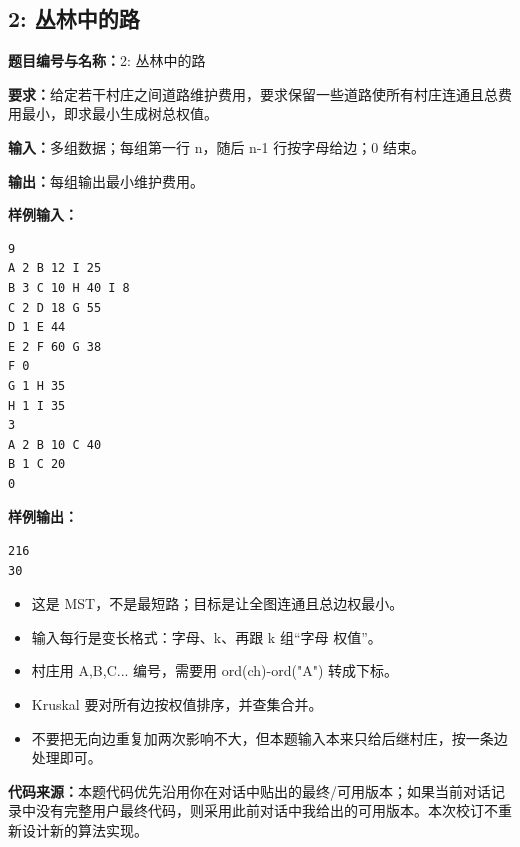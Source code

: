 \documentclass[10pt,a4paper,fontset=none]{ctexart}
\newcommand{\codesource}{\par\noindent\textbf{代码来源：}本题代码优先沿用你在对话中贴出的最终/可用版本；如果当前对话记录中没有完整用户最终代码，则采用此前对话中我给出的可用版本。本次校订不重新设计新的算法实现。\par\vspace{0.2em}}
\begin{document}
\subsection{2: 丛林中的路}
\begin{taskbox}
\textbf{题目编号与名称：}2: 丛林中的路\par
\textbf{要求：}给定若干村庄之间道路维护费用，要求保留一些道路使所有村庄连通且总费用最小，即求最小生成树总权值。\par
\textbf{输入：}多组数据；每组第一行 n，随后 n-1 行按字母给边；0 结束。\par
\textbf{输出：}每组输出最小维护费用。\par
\textbf{样例输入：}
\begin{lstlisting}[style=sample]
9
A 2 B 12 I 25
B 3 C 10 H 40 I 8
C 2 D 18 G 55
D 1 E 44
E 2 F 60 G 38
F 0
G 1 H 35
H 1 I 35
3
A 2 B 10 C 40
B 1 C 20
0
\end{lstlisting}
\textbf{样例输出：}
\begin{lstlisting}[style=sample]
216
30
\end{lstlisting}
\end{taskbox}
\begin{mistakebox}
\begin{itemize}
  \item 这是 MST，不是最短路；目标是让全图连通且总边权最小。
  \item 输入每行是变长格式：字母、k、再跟 k 组“字母 权值”。
  \item 村庄用 A,B,C... 编号，需要用 ord(ch)-ord("A") 转成下标。
  \item Kruskal 要对所有边按权值排序，并查集合并。
  \item 不要把无向边重复加两次影响不大，但本题输入本来只给后继村庄，按一条边处理即可。
\end{itemize}
\end{mistakebox}
\codesource
\end{document}

